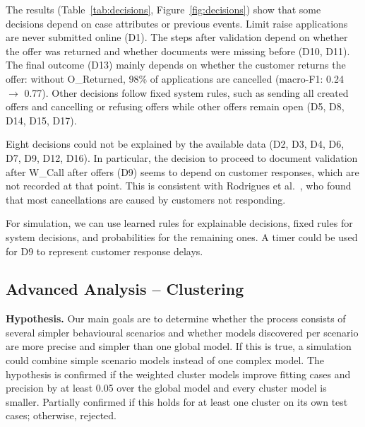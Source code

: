 \documentclass[
  english,        %
  font=times,     %
  twocolumn,      %
]{tumarticle}
\let\oldsubsection\subsection
\renewcommand{\subsection}{\FloatBarrier\oldsubsection}
\begin{document}
\begin{table}[!htb]
    \caption{Decision mining at the XOR gateways D1--D17 of the final model (test set): majority baseline vs.\ decision tree (CART, depth 3). Expl.\ = explained by the tree.}
    \label{tab:decisions}
    \centering
    \footnotesize
    \setlength{\tabcolsep}{2.5pt}
    
\end{table}

The results (Table~\ref{tab:decisions}, Figure~\ref{fig:decisions}) show that some decisions depend on case attributes or previous events. Limit raise applications are never submitted online (D1). The steps after validation depend on whether the offer was returned and whether documents were missing before (D10, D11). The final outcome (D13) mainly depends on whether the customer returns the offer: without O\_Returned, 98\% of applications are cancelled (macro-F1: 0.24 $\rightarrow$ 0.77). Other decisions follow fixed system rules, such as sending all created offers and cancelling or refusing offers while other offers remain open (D5, D8, D14, D15, D17).

Eight decisions could not be explained by the available data (D2, D3, D4, D6, D7, D9, D12, D16). In particular, the decision to proceed to document validation after W\_Call after offers (D9) seems to depend on customer responses, which are not recorded at that point. This is consistent with Rodrigues et al.\ \cite{rodrigues2017}, who found that most cancellations are caused by customers not responding.

For simulation, we can use learned rules for explainable decisions, fixed rules for system decisions, and probabilities for the remaining ones. A timer could be used for D9 to represent customer response delays.

\subsection{Advanced Analysis -- Clustering}
\label{sec:clustering}
\textbf{Hypothesis.} Our main goals are to determine whether the process consists of several simpler behavioural scenarios and whether models discovered per scenario are more precise and simpler than one global model. If this is true, a simulation could combine simple scenario models instead of one complex model. The hypothesis is confirmed if the weighted cluster models improve fitting cases and precision by at least 0.05 over the global model and every cluster model is smaller. Partially confirmed if this holds for at least one cluster on its own test cases; otherwise, rejected.
\end{document}
